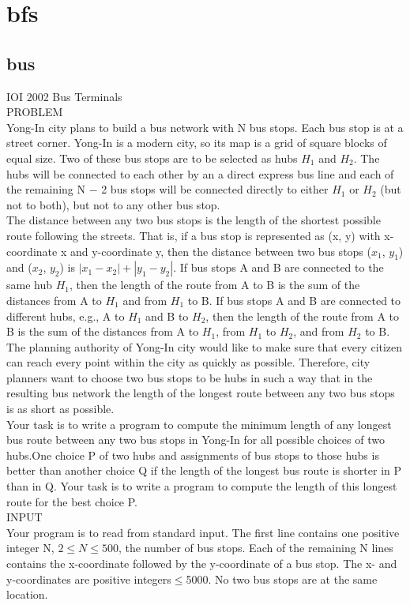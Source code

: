 \documentclass[12pt,twiside,a4paper]{ctexbook}
\numberwithin{chapter}{part}
\begin{document}
\chapter{bfs}
\section{bus}
IOI 2002 Bus Terminals\\
PROBLEM\\
Yong-In city plans to build a bus network with N bus stops. Each bus stop is at a street corner. Yong-In is a modern city, so its map is a grid of square blocks of equal size. Two of these bus stops are to be selected as hubs $H_1$ and $H_2$. The hubs will be connected to each other by an a direct express bus line and each of the remaining N − 2 bus stops will be connected directly to either $H_1$ or $H_2$  (but not to both), but not to any other bus stop.\\
The distance between any two bus stops is the length of the shortest possible route following the streets. That is, if a bus stop is represented as (x, y) with x-coordinate x and y-coordinate y, then the distance between two bus stops ($x_1$, $y_1$) and ($x_2$, $y_2$) is $|x_1-x_2|+|y_1-y_2|$. If bus stops A and B are connected to the same hub $H_1$, then the length of the route from A to B is the sum of the distances from A to $H_1$ and from $H_1$ to B. If bus stops A and B are connected to different hubs, e.g., A to $H_1$ and B to $H_2$, then the length of the route from A to B is the sum of the distances from A to $H_1$, from $H_1$ to $H_2$, and from $H_2$ to B.\\
The planning authority of Yong-In city would like to make sure that every citizen can reach every point within the city as quickly as possible. Therefore, city planners want to choose two bus stops to be hubs in such a way that in the resulting bus network the length of the longest route between any two bus stops is as short as possible. \\
Your task is to write a program to compute the minimum length of any longest bus route between any two bus stops in Yong-In for all possible choices of two hubs.One choice P of two hubs and assignments of bus stops to those hubs is better than another choice Q if the length of the longest bus route is shorter in P than in Q.  Your task is to write a program to compute the length of this longest route for the best choice P. \\
INPUT\\
Your program is to read from standard input. The first line contains one positive integer N, $2\leq N\leq 500$, the number of bus stops. Each of the remaining N lines contains the x-coordinate followed by the y-coordinate of a bus stop. The x- and y-coordinates are positive integers$\leq$5000.  No two bus stops are at the same location.\\
\end{document}
